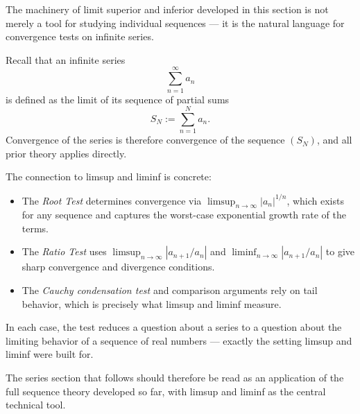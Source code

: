 \begin{remark}
The machinery of limit superior and inferior developed in this section
is not merely a tool for studying individual sequences --- it is the
natural language for convergence tests on infinite series.

Recall that an infinite series
\[
\sum_{n=1}^{\infty} a_n
\]
is defined as the limit of its sequence of partial sums
\[
S_N := \sum_{n=1}^{N} a_n.
\]
Convergence of the series is therefore convergence of the sequence
$(S_N)$, and all prior theory applies directly.

The connection to limsup and liminf is concrete:
\begin{itemize}
  \item The \emph{Root Test} determines convergence via
        $\limsup_{n\to\infty} |a_n|^{1/n}$, which exists for any
        sequence and captures the worst-case exponential growth rate
        of the terms.
  \item The \emph{Ratio Test} uses
        $\limsup_{n\to\infty} |a_{n+1}/a_n|$ and
        $\liminf_{n\to\infty} |a_{n+1}/a_n|$ to give sharp
        convergence and divergence conditions.
  \item The \emph{Cauchy condensation test} and comparison arguments
        rely on tail behavior, which is precisely what limsup and
        liminf measure.
\end{itemize}

In each case, the test reduces a question about a series to a question
about the limiting behavior of a sequence of real numbers --- exactly
the setting limsup and liminf were built for.

The series section that follows should therefore be read as an
application of the full sequence theory developed so far, with
limsup and liminf as the central technical tool.
\end{remark}
